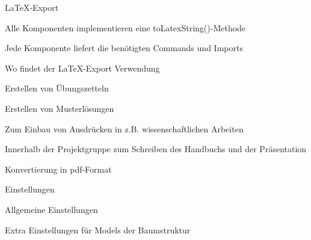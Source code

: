 {
  \begin{itemgroup}{\LaTeX-Export}
    \item Alle Komponenten implementieren eine toLatexString()-Methode
    \item Jede Komponente liefert die benötigten Commands und Imports

  \end{itemgroup}
}

{
  \begin{itemgroup}{Wo findet der \LaTeX-Export Verwendung}
    \item Erstellen von Übungszetteln
    \item Erstellen von Musterlösungen
    \item Zum Einbau von Ausdrücken in z.B. wissenschaftlichen Arbeiten
    \item Innerhalb der Projektgruppe zum Schreiben des Handbuchs und der Präsentation
    \item Konvertierung in pdf-Format
  \end{itemgroup}
}

{
  \begin{itemgroup}{Einstellungen}
    \item Allgemeine Einstellungen
    \item Extra Einstellungen für Models der Baumstruktur

  \end{itemgroup}
}